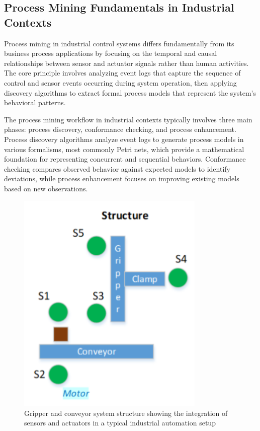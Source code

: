 \subsection{Process Mining Fundamentals in Industrial Contexts}

Process mining in industrial control systems differs fundamentally from its business process applications by focusing on the temporal and causal relationships between sensor and actuator signals rather than human activities. The core principle involves analyzing event logs that capture the sequence of control and sensor events occurring during system operation, then applying discovery algorithms to extract formal process models that represent the system's behavioral patterns.

The process mining workflow in industrial contexts typically involves three main phases: process discovery, conformance checking, and process enhancement. Process discovery algorithms analyze event logs to generate process models in various formalisms, most commonly Petri nets, which provide a mathematical foundation for representing concurrent and sequential behaviors. Conformance checking compares observed behavior against expected models to identify deviations, while process enhancement focuses on improving existing models based on new observations.

\begin{figure}[h]
    \centering
    \includegraphics[width=0.8\textwidth]{MX_Papers/Paper5/images/structure.PNG}
    \caption{Gripper and conveyor system structure showing the integration of sensors and actuators in a typical industrial automation setup}
    \label{fig:gripper_conveyor_structure}
\end{figure}

